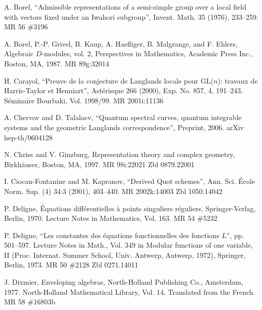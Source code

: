 \par\noindent [Borel 1976] A. Borel, ``Admissible representations of a semi-simple group over a local field with vectors fixed under an Iwahori subgroup'', Invent. Math. 35 (1976), 233--259. MR 56 \#3196

\par\noindent [Borel et al. 1987] A. Borel, P.-P. Grivel, B. Kaup, A. Haefliger, B. Malgrange, and F. Ehlers, Algebraic $D$-modules, vol. 2, Perspectives in Mathematics, Academic Press Inc., Boston, MA, 1987. MR 89g:32014

\par\noindent [Carayol 2000] H. Carayol, ``Preuve de la conjecture de Langlands locale pour GL($n$): travaux de Harris-Taylor et Henniart'', Ast\'erisque 266 (2000), Exp. No. 857, 4, 191--243. S\'eminaire Bourbaki, Vol. 1998/99. MR 2001i:11136

\par{} A. Chervov and D. Talalaev, ``Quantum spectral curves, quantum integrable systems and the geometric Langlands correspondence'', Preprint, 2006. arXiv hep-th/0604128

\par{} N. Chriss and V. Ginzburg, Representation theory and complex geometry, Birkh\"auser, Boston, MA, 1997. MR 98i:22021 Zbl 0879.22001

\par{} I. Ciocan-Fontanine and M. Kapranov, ``Derived Quot schemes'', Ann. Sci. \'Ecole Norm. Sup. (4) 34:3 (2001), 403--440. MR 2002k:14003 Zbl 1050.14042

\par\noindent [Deligne 1970] P. Deligne, \'Equations diff\'erentielles \`a points singuliers r\'eguliers, Springer-Verlag, Berlin, 1970. Lecture Notes in Mathematics, Vol. 163. MR 54 \#5232

\par\noindent [Deligne 1973] P. Deligne, ``Les constantes des \'equations fonctionnelles des fonctions $L$'', pp. 501--597. Lecture Notes in Math., Vol. 349 in Modular functions of one variable, II (Proc. Internat. Summer School, Univ. Antwerp, Antwerp, 1972), Springer, Berlin, 1973. MR 50 \#2128 Zbl 0271.14011

\par\noindent [Dixmier 1977] J. Dixmier, Enveloping algebras, North-Holland Publishing Co., Amsterdam, 1977. North-Holland Mathematical Library, Vol. 14, Translated from the French. MR 58 \#16803b

